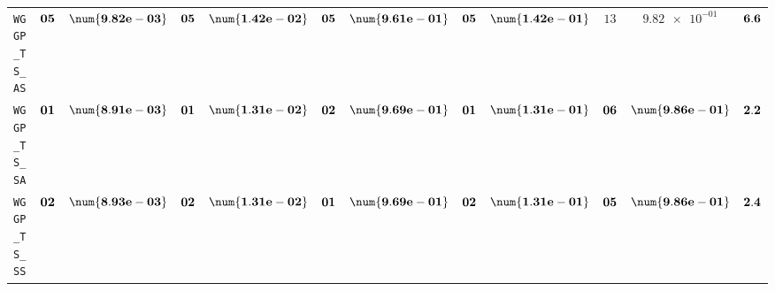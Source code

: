 \begin{xltabular}{\textwidth}{l||cC|cC|cC|cC|cC||c}
	\texttt{WGGP\_TS\_AS} & $\bf 05$ & $\bf \num{9.82e-03}$ & $\bf 05$ & $\bf \num{1.42e-02}$ & $\bf 05$ & $\bf \num{9.61e-01}$ & $\bf 05$ & $\bf \num{1.42e-01}$ & $ 13$ & $ \num{9.82e-01}$ & $\bf 6.6$  \\
	\texttt{WGGP\_TS\_SA} & $\bf 01$ & $\bf \num{8.91e-03}$ & $\bf 01$ & $\bf \num{1.31e-02}$ & $\bf 02$ & $\bf \num{9.69e-01}$ & $\bf 01$ & $\bf \num{1.31e-01}$ & $\bf 06$ & $\bf \num{9.86e-01}$ & $\bf 2.2$  \\
	\texttt{WGGP\_TS\_SS} & $\bf 02$ & $\bf \num{8.93e-03}$ & $\bf 02$ & $\bf \num{1.31e-02}$ & $\bf 01$ & $\bf \num{9.69e-01}$ & $\bf 02$ & $\bf \num{1.31e-01}$ & $\bf 05$ & $\bf \num{9.86e-01}$ & $\bf 2.4$  \\
\end{xltabular}
